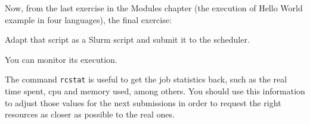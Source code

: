 Now, from the last exercise in the Modules chapter (the execution of Hello World example in four languages), the final exercise:

\begin{questions}
    Adapt that script as a Slurm script and submit it to the scheduler.
\end{questions} 
You can monitor its execution.

\begin{information}
The command \texttt{rcstat} is useful to get the job statistics back, such as the real time spent, cpu and memory used, among others. 
You should use this information to adjust those values for the next submissions in order to request the right resources
as closer as possible to the real ones.
\end{information}
